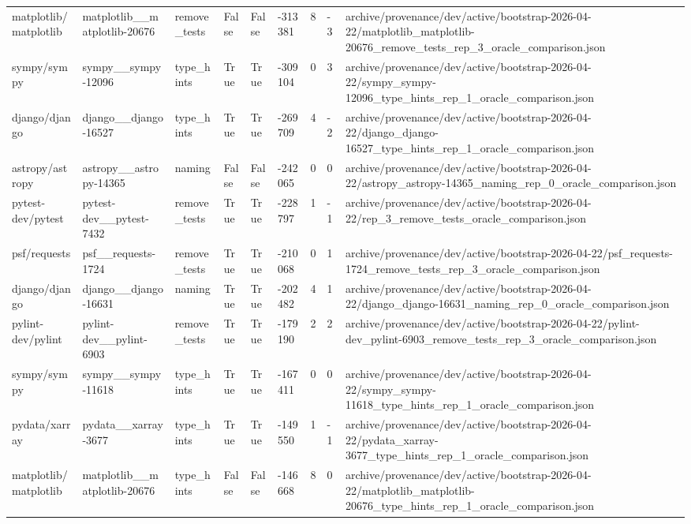 \begin{tabular}{lllllllll}
matplotlib/matplotlib & matplotlib\_\_matplotlib-20676 & remove\_tests & False & False & -313381 & 8 & -3 & archive/provenance/dev/active/bootstrap-2026-04-22/matplotlib\_matplotlib-20676\_remove\_tests\_rep\_3\_oracle\_comparison.json \\
sympy/sympy & sympy\_\_sympy-12096 & type\_hints & True & True & -309104 & 0 & 3 & archive/provenance/dev/active/bootstrap-2026-04-22/sympy\_sympy-12096\_type\_hints\_rep\_1\_oracle\_comparison.json \\
django/django & django\_\_django-16527 & type\_hints & True & True & -269709 & 4 & -2 & archive/provenance/dev/active/bootstrap-2026-04-22/django\_django-16527\_type\_hints\_rep\_1\_oracle\_comparison.json \\
astropy/astropy & astropy\_\_astropy-14365 & naming & False & False & -242065 & 0 & 0 & archive/provenance/dev/active/bootstrap-2026-04-22/astropy\_astropy-14365\_naming\_rep\_0\_oracle\_comparison.json \\
pytest-dev/pytest & pytest-dev\_\_pytest-7432 & remove\_tests & True & True & -228797 & 1 & -1 & archive/provenance/dev/active/bootstrap-2026-04-22/rep\_3\_remove\_tests\_oracle\_comparison.json \\
psf/requests & psf\_\_requests-1724 & remove\_tests & True & True & -210068 & 0 & 1 & archive/provenance/dev/active/bootstrap-2026-04-22/psf\_requests-1724\_remove\_tests\_rep\_3\_oracle\_comparison.json \\
django/django & django\_\_django-16631 & naming & True & True & -202482 & 4 & 1 & archive/provenance/dev/active/bootstrap-2026-04-22/django\_django-16631\_naming\_rep\_0\_oracle\_comparison.json \\
pylint-dev/pylint & pylint-dev\_\_pylint-6903 & remove\_tests & True & True & -179190 & 2 & 2 & archive/provenance/dev/active/bootstrap-2026-04-22/pylint-dev\_pylint-6903\_remove\_tests\_rep\_3\_oracle\_comparison.json \\
sympy/sympy & sympy\_\_sympy-11618 & type\_hints & True & True & -167411 & 0 & 0 & archive/provenance/dev/active/bootstrap-2026-04-22/sympy\_sympy-11618\_type\_hints\_rep\_1\_oracle\_comparison.json \\
pydata/xarray & pydata\_\_xarray-3677 & type\_hints & True & True & -149550 & 1 & -1 & archive/provenance/dev/active/bootstrap-2026-04-22/pydata\_xarray-3677\_type\_hints\_rep\_1\_oracle\_comparison.json \\
matplotlib/matplotlib & matplotlib\_\_matplotlib-20676 & type\_hints & False & False & -146668 & 8 & 0 & archive/provenance/dev/active/bootstrap-2026-04-22/matplotlib\_matplotlib-20676\_type\_hints\_rep\_1\_oracle\_comparison.json \\

\end{tabular}
